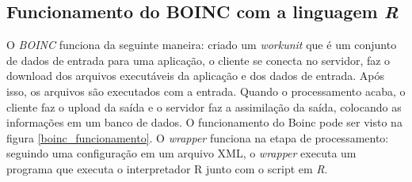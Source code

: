 \documentclass[b1]{sciposter}
\begin{document}
\begin{multicols}{2}
\section{Funcionamento do BOINC com a linguagem \textit{R}}



O \textit{BOINC} funciona da seguinte maneira: criado um \textit{workunit} que é um conjunto de dados de entrada para uma aplicação, 
o cliente se conecta no servidor, faz o download dos arquivos executáveis da aplicação e dos dados de entrada. Após isso, 
os arquivos são executados com a entrada. Quando o processamento acaba, o cliente faz o upload da saída
e o servidor faz a assimilação da saída, colocando as informações em um banco de dados. O funcionamento do Boinc pode ser visto 
na figura \ref{boinc_funcionamento}. O \textit{wrapper} funciona na etapa de processamento: seguindo
uma configuração em um arquivo XML, o \textit{wrapper} executa um programa que executa o interpretador R junto com
o script em \textit{R}.



\end{multicols}
\end{document}
